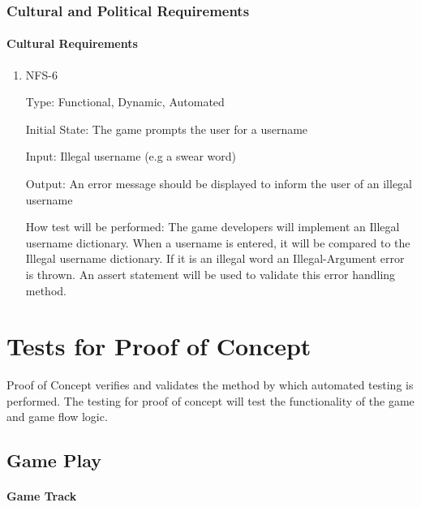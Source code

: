 \documentclass[12pt, titlepage]{article}
\begin{document}
	
	\subsubsection{Cultural and Political Requirements}
	
	\paragraph{Cultural Requirements}
	\begin{enumerate}
		\item{NFS-6\\}
		
		Type: Functional, Dynamic, Automated 
		
		Initial State: The game prompts the user for a username
		
		Input: Illegal username (e.g a swear word)
		
		Output: An error message should be displayed to inform the user of an illegal username
		
		How test will be performed: The game developers will implement an Illegal username dictionary. When a username is entered, it will be compared to the Illegal username dictionary. If it is an illegal word an Illegal-Argument error is thrown. An assert statement will be used to validate this error handling method.
		
	\end{enumerate}
	
	\section{Tests for Proof of Concept}
	
	Proof of Concept verifies and validates the method by which automated testing is performed. The testing for proof of concept will test the functionality of the game and game flow logic. 
	
	
	\subsection{Game Play}
	
	\paragraph{Game Track}
	
\end{document}
